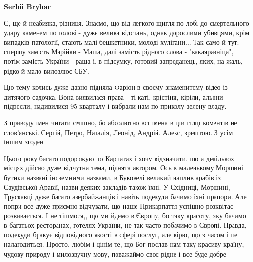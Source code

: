 \begin{itemize}
\begin{itemize}
 
\textbf{Serhii Bryhar} 

Є, ще й неабияка, різниця. Знаємо, що від легкого щигля по лобі до смертельного
удару каменем по голові - дуже велика відстань, однак дорослими убивцями, крім
випадків патології, стають малі бешкетники, молоді хулігани... Так само й тут:
спершу замість Марійки - Маша, далі замість рідного слова - "какаяразніца",
потім замість України - раша і, в підсумку, готовий запроданець, яких, на жаль,
рідко й мало виловлює СБУ.


 

Цю тему колись дуже давно підняла Фаріон в своєму знаменитому відео із дитячого
садочка. Вона виявилася права - ті каті, крістіни, кіріли, альони підросли,
надивилися 95 кварталу і вибрали нам по приколу зелену владу.


 

З приводу імен читати смішно, бо абсолютно всі імена в цій гілці коментів не
слов'янські. Сергій, Петро, Наталія, Леонід, Андрій. Алекс, зрештою. З усім
іншим згоден

\end{itemize}

 

Цього року багато подорожую по Карпатах і хочу відзначити, що а декількох місцях
дійсно дуже відчутна тема, піднята автором. Ось в маленькому Моршині бутики
названі іноземними назвами, в Буковелі великий наплив арабів із Саудівської
Аравії, назви деяких закладів також їхні. У Східниці, Моршині, Трускавці дуже
багато азербайжанців і навіть подекуди бачимо їхні прапори. Але попри все дуже
приємно відчувати, що наше Прикарпаття успішно розквітає, розвивається. І не
тішмося,, що ми йдемо в Європу, бо таку красоту, яку бачимо в багатьох
ресторанах, готелях України, не так часто побачимо в Європі. Правда, подекуди
бракує відповідного якості в сфері послуг, але вірю, що з часом і це
налагодиться. Просто, любім і цінім те, що Бог послав нам таку красиву
країну, чудову природу і милозвучну мову, поважаймо своє рідне і все буде добре


\end{itemize}
